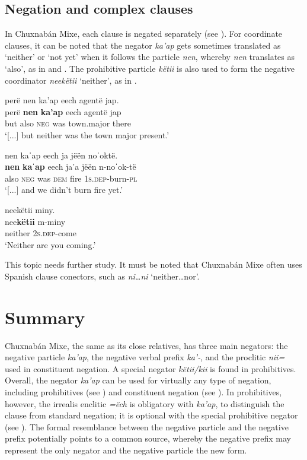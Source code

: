 \documentclass[output=paper,colorlinks,citecolor=brown,draft]{langscibook}
\begin{document}
\subsection{Negation and complex clauses}\label{sec:mix:4.5}

In Chuxnabán Mixe, each clause is negated separately (see ). For coordinate clauses, it can be noted that the negator \textit{ka’ap} gets sometimes translated as ‘neither’ or ‘not yet’ when it follows the particle \textit{nen}, whereby \textit{nen} translates as ‘also’, as in  and . The prohibitive particle \textit{këtii} is also used to form the negative coordinator \textit{neekëtii} ‘neither’, as in .

\ea\label{ex:mix:119}
    \glll perë nen ka’ap eech agentë jap. \\
          perë \textbf{nen} \textbf{ka’ap} eech agentë jap \\
          but also \textsc{neg} was town.major there \\
    \glt ‘[...] but neither was the town major present.’
\z

\ea\label{ex:mix:120}
    \glll nen kaˈap eech ja jëën noˈoktë.\\
          \textbf{nen} \textbf{kaˈap} eech ja’a jëën n-noˈok-të\\
          also \textsc{neg} was \textsc{dem} fire \textsc{1s.dep}{}-burn-\textsc{pl}\\
    \glt ‘[...] and we didn’t burn fire yet.’
\z

\ea\label{ex:mix:121}
    \glll neekëtii miny. \\
          nee\textbf{këtii} m-miny\\
          neither \textsc{2s.dep-}come\\
    \glt ‘Neither are you coming.’
\z

This topic needs further study. It must be noted that Chuxnabán Mixe often uses Spanish clause conectors, such as \textit{ni…ni} ‘neither…nor’.

\section{Summary}\label{sec:mix:5}

Chuxnabán Mixe, the same as its close relatives, has three main negators: the negative particle \textit{ka’ap}, the negative verbal prefix \textit{ka’-}, and the proclitic \textit{nii=} used in constituent negation. A special negator \textit{këtii/kii} is found in prohibitives. Overall, the negator \textit{ka’ap} can be used for virtually any type of negation, including prohibitives (see ) and constituent negation (see ). In prohibitives, however, the irrealis enclitic \textit{=ëch} is obligatory with \textit{ka’ap}, to distinguish the clause from standard negation; it is optional with the special prohibitive negator (see ). The formal resemblance between the negative particle and the negative prefix potentially points to a common source, whereby the negative prefix may represent the only negator and the negative particle the new form. 
\end{document}
